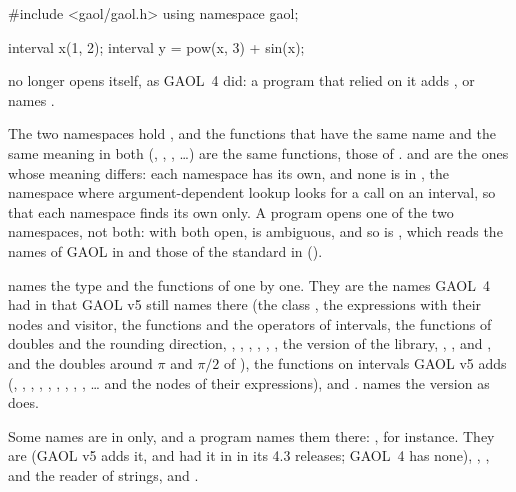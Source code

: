 \documentclass[12pt,a4paper,twoside,openright]{book}
\begin{document}
\begin{example}
#include <gaol/gaol.h>
using namespace gaol;

interval x(1, 2);
interval y = pow(x, 3) + sin(x);
\end{example}

\noindent
{} no longer opens  itself, as GAOL~4 did: a
program that relied on it adds , or names
.\newinvfive

\medskip
The two namespaces hold , and the functions that have the same
name and the same meaning in both (, , ,
\ldots) are the same functions, those of .
 and  are the ones whose meaning differs: each
namespace has its own, and none is in , the namespace where
argument-dependent lookup looks for a call  on an interval, so
that each namespace finds its own only. A program opens one of the two
namespaces, not both: with both open,  is ambiguous, and so is
, which reads the names of GAOL in  and
those of the standard in  ().

\medskip
{} names the type and the functions of  one by
one.\newinvfive{} They are the names GAOL~4 had in  that GAOL v5
still names there (the class , the expressions with their nodes
and visitor, the functions and the operators of intervals, the functions of
doubles and the rounding direction, ,
, , ,
, , the version of the library,
, ,  and
, and the doubles around $\pi$ and $\pi/2$ of
), the functions on intervals GAOL v5 adds (,
, , , , ,
, , ,
\ldots{} and the nodes of their expressions),
 and . 
names the version as  does.

\noindent
Some names are in  only, and a program names them there:
, for instance.\newinvfive{} They are
 (GAOL v5 adds it, and had it in  in its 4.3
releases; GAOL~4 has none), , , and the
reader of strings,  and .
\end{document}
